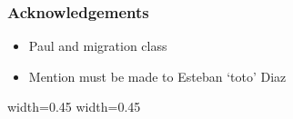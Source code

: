 \begin{frame} \frametitle{Acknowledgements}

   \begin{itemize} 
    \item Paul and migration class
    \item Mention must be made to Esteban `toto' Diaz
     \end{itemize}
\end{frame}










\begin{frame}
   \begin{multicols}{2}
      {width=0.45\textwidth} {}
      {width=0.45\textwidth} {}
   \end{multicols}
\end{frame}
\begin{frame}
   \begin{multicols}{2}
      {}
      {}
   \end{multicols}

	
\end{frame}
\begin{frame}
   \begin{multicols}{2}
      {}
      {}
   \end{multicols}

	
\end{frame}
\begin{frame}
   \begin{multicols}{2}
      {}
      {}
   \end{multicols}

	
\end{frame}
\begin{frame}
   \begin{multicols}{2}
      {}
      {}
   \end{multicols}

	
\end{frame}
